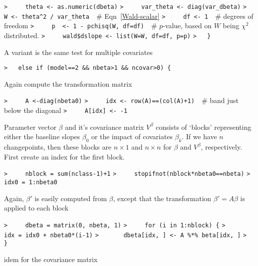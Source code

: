 \documentclass[a4paper]{article}
\begin{document}
\verb~>     theta <- as.numeric(dbeta)~\newline
\verb~>     var_theta <- diag(var_dbeta)~\newline
\verb~>     W <- theta^2 / var_theta  ~{\sffamily\# Eqn~\eqref{Wald-scalar}}\newline
\verb~>     df <- 1  ~{\sffamily\# degrees of freedom}\newline
\verb~>     p  <- 1 - pchisq(W, df=df)  ~{\sffamily\# $p$-value, based on $W$ being $\chi^2$ distributed.}\newline
\verb~>     wald$dslope <- list(W=W, df=df, p=p)~\newline
\verb~>   }~\par

A variant is the same test for  multiple covariates\par
\verb~>   else if (model==2 && nbeta>1 && ncovar>0) {~\par
Again compute the transformation matrix\par
\verb~>     A <-diag(nbeta0)~\newline
\verb~>     idx <- row(A)==(col(A)+1)  ~{\sffamily\# band just below the diagonal}\newline
\verb~>     A[idx] <- -1~\par
Parameter vector $\beta$ and it's covariance matrix $V^\beta$ consists of `blocks'
representing either the baseline slopes $\beta_0$ or the impact of covariates $\beta_k$.
If we have $n$ changepoints, then these blocks are $n\times 1$ and $n\times n$ for
$\beta$ and $V^\beta$, respectively. First create an index for the first block.\par
\verb~>     nblock = sum(nclass-1)+1~\newline
\verb~>     stopifnot(nblock*nbeta0==nbeta)~\newline
\verb~>     idx0 = 1:nbeta0~\par
Again, $\beta'$ is easily computed from $\beta$, except that the transformation
$\beta' = A\beta$ is applied to each block\par
\verb~>     dbeta = matrix(0, nbeta, 1)~\newline
\verb~>     for (i in 1:nblock) {~\newline
\verb~>       idx = idx0 + nbeta0*(i-1)~\newline
\verb~>       dbeta[idx, ] <- A %*% beta[idx, ]~\newline
\verb~>     }~\par
idem for the covariance matrix\par
\end{document}
